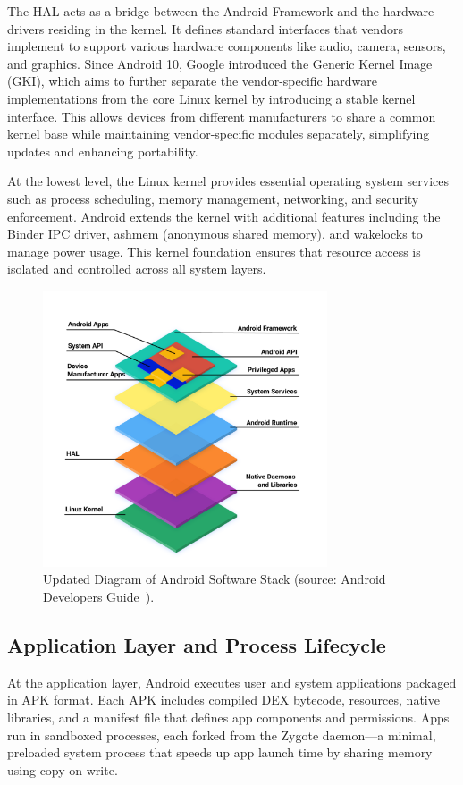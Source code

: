 \documentclass[a4paper,12pt]{report}
\begin{document}
The HAL acts as a bridge between the Android Framework and the hardware drivers residing in the kernel. It defines standard interfaces that vendors implement to support various hardware components like audio, camera, sensors, and graphics. Since Android 10, Google introduced the Generic Kernel Image (GKI), which aims to further separate the vendor-specific hardware implementations from the core Linux kernel by introducing a stable kernel interface. This allows devices from different manufacturers to share a common kernel base while maintaining vendor-specific modules separately, simplifying updates and enhancing portability.

At the lowest level, the Linux kernel provides essential operating system services such as process scheduling, memory management, networking, and security enforcement. Android extends the kernel with additional features including the Binder IPC driver, ashmem (anonymous shared memory), and wakelocks to manage power usage. This kernel foundation ensures that resource access is isolated and controlled across all system layers.

\begin{figure}[H]
    \centering
    \includegraphics[width=0.75\textwidth]{android_stack_diagram.png}
    \caption{Updated Diagram of Android Software Stack (source: Android Developers Guide~\cite{androidplatformdoc}).}
    \label{fig:android_stack}
\end{figure}

\subsection{Application Layer and Process Lifecycle}
At the application layer, Android executes user and system applications packaged in APK format. Each APK includes compiled DEX bytecode, resources, native libraries, and a manifest file that defines app components and permissions. Apps run in sandboxed processes, each forked from the Zygote daemon—a minimal, preloaded system process that speeds up app launch time by sharing memory using copy-on-write.
\end{document}

